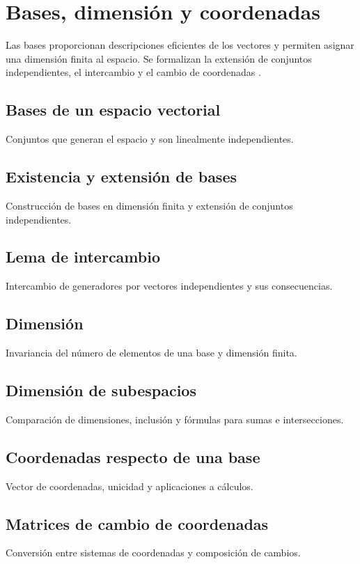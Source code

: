 \chapter{Bases, dimensión y coordenadas}
\label{cap:bases-dimension}

Las bases proporcionan descripciones eficientes de los vectores y permiten asignar una dimensión finita al espacio. Se formalizan la extensión de conjuntos independientes, el intercambio y el cambio de coordenadas \cite{lang1986,lang1987,axler2024}.

\section{Bases de un espacio vectorial}
Conjuntos que generan el espacio y son linealmente independientes.

\section{Existencia y extensión de bases}
Construcción de bases en dimensión finita y extensión de conjuntos independientes.

\section{Lema de intercambio}
Intercambio de generadores por vectores independientes y sus consecuencias.

\section{Dimensión}
Invariancia del número de elementos de una base y dimensión finita.

\section{Dimensión de subespacios}
Comparación de dimensiones, inclusión y fórmulas para sumas e intersecciones.

\section{Coordenadas respecto de una base}
Vector de coordenadas, unicidad y aplicaciones a cálculos.

\section{Matrices de cambio de coordenadas}
Conversión entre sistemas de coordenadas y composición de cambios.
